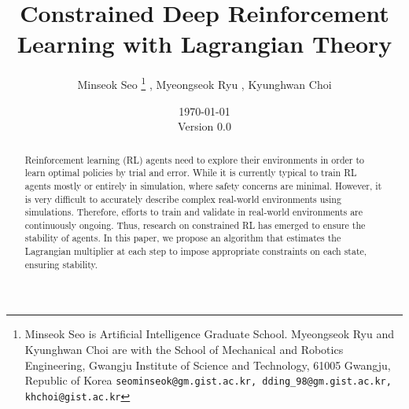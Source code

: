 \documentclass{article}
\title{
    Constrained Deep Reinforcement Learning with Lagrangian Theory
}
\author{
    Minseok Seo
    \thanks{Minseok Seo is Artificial Intelligence Graduate School. Myeongseok Ryu and Kyunghwan Choi are with the School of Mechanical and Robotics Engineering, Gwangju Institute of Science and Technology, 61005 Gwangju, Republic of Korea {\tt\small seominseok@gm.gist.ac.kr, dding\_98@gm.gist.ac.kr, khchoi@gist.ac.kr}}%
    ,
    Myeongseok Ryu
    \footnotemark[1]%
    ,
    Kyunghwan Choi
    \footnotemark[1]
}
\date{
    \today
    \\
    Version 0.0
}
\newcommand*{\template}{../template}
\begin{document}
\maketitle

\begin{abstract}
Reinforcement learning (RL) agents need to explore their environments in order to learn optimal policies by trial and error.
While it is currently typical to train RL agents mostly or entirely in simulation, where safety concerns are minimal.
However, it is very difficult to accurately describe complex real-world environments using simulations.
Therefore, efforts to train and validate in real-world environments are continuously ongoing.
Thus, research on constrained RL has emerged to ensure the stability of agents.
In this paper, we propose an algorithm that estimates the Lagrangian multiplier at each step to impose appropriate constraints on each state, ensuring stability.
\end{abstract}

\tableofcontents









\begin{appendices}
\end{appendices}




\end{document}
